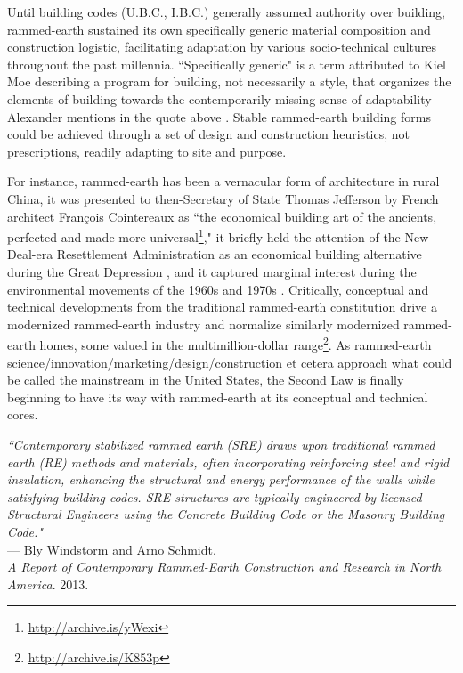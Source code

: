 Until building codes (U.B.C., I.B.C.) generally assumed authority over building, rammed-earth sustained its own specifically generic material composition and construction logistic, facilitating adaptation by various socio-technical cultures throughout the past millennia. ``Specifically generic" is a term attributed to Kiel Moe describing a program for building, not necessarily a style, that organizes the elements of building towards the contemporarily missing sense of adaptability Alexander mentions in the quote above \cite{MOECONVERGENCE}. Stable rammed-earth building forms could be achieved through a set of design and construction heuristics, not prescriptions, readily adapting to site and purpose.

For instance, rammed-earth has been a vernacular form of architecture in rural China, it was presented to then-Secretary of State Thomas Jefferson by French architect Fran\c cois Cointereaux as ``the economical building art of the ancients, perfected and made more universal\footnote{\url{http://archive.is/yWexi}}," it briefly held the attention of the New Deal-era Resettlement Administration as an economical building alternative during the Great Depression \cite{GARDENDALE}, and it captured marginal interest during the environmental movements of the 1960s and 1970s \cite{GARDENDALE}. Critically, conceptual and technical developments from the traditional rammed-earth constitution drive a modernized rammed-earth industry and normalize similarly modernized rammed-earth homes, some valued in the multimillion-dollar range\footnote{\url{http://archive.is/K853p}}. As rammed-earth science/innovation/marketing/design/construction et cetera approach what could be called the mainstream in the United States, the Second Law is finally beginning to have its way with rammed-earth at its conceptual and technical cores.

\begin{flushright}
\small{
\textit{
``Contemporary stabilized rammed earth (SRE) draws upon traditional rammed earth (RE) methods and materials, often incorporating reinforcing steel and rigid insulation, enhancing the structural and energy performance of the walls while satisfying building codes. SRE structures are typically engineered by licensed Structural Engineers using the Concrete Building Code or the Masonry Building Code."}} \\ --- Bly Windstorm and Arno Schmidt. \\ \textit{A Report of Contemporary Rammed-Earth Construction and Research in North America}. 2013.
\end{flushright}

